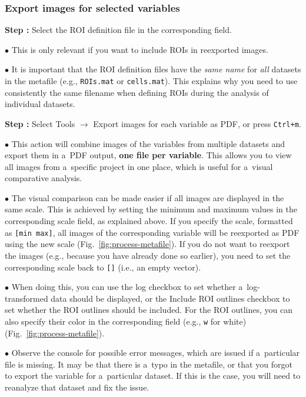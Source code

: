 \documentclass[a4paper, 11pt]{article}
\newcommand{\ttt}[1]{\texttt{#1}}
\newcommand{\lans}[1]{{\color{magenta}#1}}
\newcommand{\lanscb}[1]{{\color{darkgreen}#1}}
\newcommand{\lanstf}[1]{{\color{cyan}#1}}
\newcommand\ra{\rightarrow}
\newcounter{step}
\newcommand\s{\addtocounter{step}{1}\vskip5pt\noindent\textbf{Step \thestep:}{ }}
\newcommand\bul{\vskip5pt\noindent$\bullet${ }}
\newcommand\bb[1]{\textbf{#1}}
\begin{document}
\subsubsection{Export images for selected variables}
\label{sec:621}
\setcounter{step}{0}

\s Select the \lanstf{ROI definition file} in the corresponding field.

\bul This is only relevant if you want to include ROIs in reexported images.

\bul It is important that the ROI definition files have the \emph{same name} for \emph{all} datasets in the metafile (e.g., \ttt{ROIs.mat} or \ttt{cells.mat}). This explains why you need to use consistently the same filename when defining ROIs during the analysis of individual datasets.

\s Select \lans{Tools} $\ra$ \lans{Export images for each variable as PDF}, or press \ttt{Ctrl+m}. 

\bul This action will combine images of the variables from multiple datasets and export them in a~PDF output, \bb{one file per variable}. This allows you to view all images from a~specific project in one place, which is useful for a~visual comparative analysis.

\bul The visual comparison can be made easier if all images are displayed in the same scale. This is achieved by setting the minimum and maximum values in the corresponding \lanstf{scale} field, as explained above. If you specify the scale, formatted as \ttt{[min max]}, all images of the corresponding variable will be reexported as PDF using the new scale (Fig.~\ref{fig:process-metafile}). If you do not want to reexport the images (e.g., because you have already done so earlier), you need to set the corresponding scale back to \ttt{[]} (i.e., an empty vector).

\bul When doing this, you can use the \lanscb{log} checkbox to set whether a~log-transformed data should be displayed, or the \lanscb{Include ROI outlines} checkbox to set whether the ROI outlines should be included. For the ROI outlines, you can also specify their \lanstf{color} in the corresponding field (e.g., \ttt{w} for white) (Fig.~\ref{fig:process-metafile}). 

\bul Observe the console for possible error messages, which are issued if a~particular file is missing. It may be that there is a~typo in the metafile, or that you forgot to export the variable for a~particular dataset. If this is the case, you will need to reanalyze that dataset and fix the issue.
\end{document}
